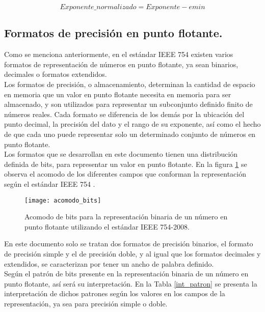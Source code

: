 \begin{equation}\label{eq:Ec_esp_norm}
Exponente\_normalizado = Exponente - emin
\end{equation}

\newpage

\subsection{Formatos de precisión en punto flotante.}

Como se menciona anteriormente, en el estándar IEEE 754 existen varios formatos de representación de números en punto flotante, ya sean binarios, decimales o formatos extendidos.\\

Los formatos de precisión, o almacenamiento, determinan la cantidad de espacio en memoria que un valor en punto flotante necesita en memoria para ser almacenado, y son utilizados para representar un subconjunto definido finito de números reales. Cada formato se diferencia de los demás por la ubicación del punto decimal, la precisión del dato y el rango de su exponente, así como el hecho de que cada uno puede representar solo un determinado conjunto de números en punto flotante\cite{Tesis_Diego}.\\

Los formatos que se desarrollan en este documento tienen una distribución definida de bits, para representar un valor en punto flotante. En la figura \ref{fig:acomodo_bits} se observa el acomodo de los diferentes campos que conforman la representación según el estándar IEEE 754 \cite{IEEE754}.


\begin{figure}[htb]
  \centering
  \texttt{[image: acomodo\_bits]}
  \caption{Acomodo de bits para la representación binaria de un número en punto flotante utilizando el estándar IEEE 754-2008.}
  \label{fig:acomodo_bits}
\end{figure}


En este documento solo se tratan dos formatos de precisión binarios, el formato de precisión simple y el de precisión doble, y al igual que los formatos decimales y extendidos, se caracterizan por tener un ancho de palabra definido.\\

Según el patrón de bits presente en la representación binaria de un número en punto flotante, así será su interpretación. En la Tabla \ref{int_patron} se presenta la interpretación de dichos patrones según los valores en los campos de la representación, ya sea para precisión simple o doble\cite{Tesis_Diego}.



